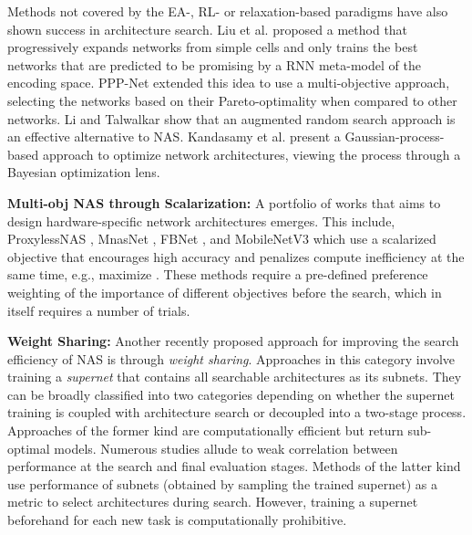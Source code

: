 \documentclass[journal]{IEEEtran}
\theoremstyle{definition}
\theoremstyle{remark}
\begin{document}
{Methods not covered by the EA-, RL- or relaxation-based paradigms have also shown success in architecture search. Liu et al. \cite{liu2018progressive} proposed a method that progressively expands networks from simple cells and only trains the best  networks that are predicted to be promising by a RNN meta-model of the encoding space. PPP-Net \cite{dong2018ppp-net} extended this idea to use a multi-objective approach, selecting the  networks based on their Pareto-optimality when compared to other networks. Li and Talwalkar \cite{li2019random} show that an augmented random search approach is an effective alternative to NAS. Kandasamy et al. \cite{kandasamy2018neural} present a Gaussian-process-based approach to optimize network architectures, viewing the process through a Bayesian optimization lens. 

\vspace{3pt}
\noindent\textbf{Multi-obj NAS through Scalarization:} A portfolio of works that aims to design hardware-specific network architectures emerges. This include, ProxylessNAS \cite{cai2018proxylessnas}, MnasNet \cite{mnasnet}, FBNet \cite{wu2019fbnet}, and MobileNetV3 \cite{mobilenetv3} which use a scalarized objective that encourages high accuracy and penalizes compute inefficiency at the same time, e.g., maximize . These methods require a pre-defined preference weighting of the importance of different objectives before the search, which in itself requires a number of trials.

\vspace{3pt}
\noindent\textbf{Weight Sharing:} Another recently proposed approach for improving the search efficiency of NAS is through \emph{weight sharing}. Approaches in this category involve training a \emph{supernet} that contains all searchable architectures as its subnets. They can be broadly classified into two categories depending on whether the supernet training is coupled with architecture search or decoupled into a two-stage process. Approaches of the former kind \cite{pmlr-v80-pham18a,liu2018darts,cai2018proxylessnas} are computationally efficient but return sub-optimal models. Numerous studies \cite{li2019random,xie2019exploring,Yu2020Evaluating} allude to weak correlation between performance at the search and final evaluation stages. Methods of the latter kind \cite{brock2018smash,one-shot} use performance of subnets (obtained by sampling the trained supernet) as a metric to select architectures during search. However, training a supernet beforehand for each new task is computationally prohibitive.}
\end{document}

